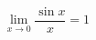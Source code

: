 \documentclass{article}
\begin{document}
    $$\lim_{x \to 0} \frac{\sin x}{x} = 1$$

    
\end{document}
